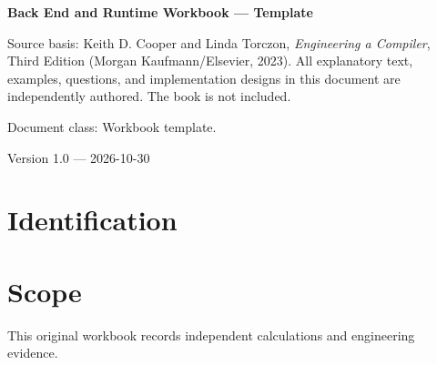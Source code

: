 \documentclass[10pt,letterpaper]{article}
\begin{document}
\hypersetup{pageanchor=false}%
\begin{titlepage}
\centering\vspace*{1.0in}
{\Huge\bfseries\textcolor{CompilerBlue}{Back End and Runtime Workbook --- Template}\par}
\vspace{.22in}{\Large Derivations, technical evidence and review\par}
\vspace{.4in}{\large Compiler Engineering Documentation Suite\par}
\vfill
\begin{minipage}{.86\linewidth}\small
Source basis: Keith D. Cooper and Linda Torczon, \emph{Engineering a Compiler}, Third Edition (Morgan Kaufmann/Elsevier, 2023). All explanatory text, examples, questions, and implementation designs in this document are independently authored. The book is not included.\par\medskip
Document class: Workbook template.
\end{minipage}
\vfill\textcolor{CompilerGray}{Version 1.0 --- 2026-10-30}\par
\end{titlepage}\hypersetup{pageanchor=true}
\tableofcontents\clearpage
\section{Identification}
\section{Scope}
 This original workbook records independent calculations and engineering evidence.
\end{document}
